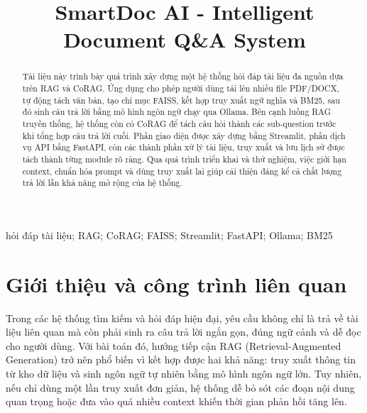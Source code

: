 \documentclass[10pt, conference, a4paper]{IEEEtran}
\begin{document}
\fontsize{10}{12}
\selectfont


\title{\Large SmartDoc AI - Intelligent Document Q\&A System}

\author{
}

\maketitle

\begin{abstract}
Tài liệu này trình bày quá trình xây dựng một hệ thống hỏi đáp tài liệu đa nguồn dựa trên RAG và CoRAG. Ứng dụng cho phép người dùng tải lên nhiều file PDF/DOCX, tự động tách văn bản, tạo chỉ mục FAISS, kết hợp truy xuất ngữ nghĩa và BM25, sau đó sinh câu trả lời bằng mô hình ngôn ngữ chạy qua Ollama. Bên cạnh luồng RAG truyền thống, hệ thống còn có CoRAG để tách câu hỏi thành các sub-question trước khi tổng hợp câu trả lời cuối. Phần giao diện được xây dựng bằng Streamlit, phần dịch vụ API bằng FastAPI, còn các thành phần xử lý tài liệu, truy xuất và lưu lịch sử được tách thành từng module rõ ràng. Qua quá trình triển khai và thử nghiệm, việc giới hạn context, chuẩn hóa prompt và dùng truy xuất lai giúp cải thiện đáng kể cả chất lượng trả lời lẫn khả năng mở rộng của hệ thống.
\end{abstract}

\begin{IEEEkeywords}
hỏi đáp tài liệu; RAG; CoRAG; FAISS; Streamlit; FastAPI; Ollama; BM25
\end{IEEEkeywords}

\IEEEpeerreviewmaketitle
\sloppy

\section{Giới thiệu và công trình liên quan}
Trong các hệ thống tìm kiếm và hỏi đáp hiện đại, yêu cầu không chỉ là trả về tài liệu liên quan mà còn phải sinh ra câu trả lời ngắn gọn, đúng ngữ cảnh và dễ đọc cho người dùng. Với bài toán đó, hướng tiếp cận RAG (Retrieval-Augmented Generation) trở nên phổ biến vì kết hợp được hai khả năng: truy xuất thông tin từ kho dữ liệu và sinh ngôn ngữ tự nhiên bằng mô hình ngôn ngữ lớn. Tuy nhiên, nếu chỉ dùng một lần truy xuất đơn giản, hệ thống dễ bỏ sót các đoạn nội dung quan trọng hoặc đưa vào quá nhiều context khiến thời gian phản hồi tăng lên.
\end{document}
